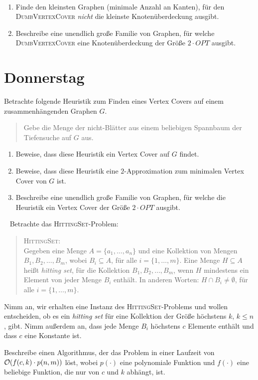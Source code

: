 \documentclass{uebung_cs}
\begin{document}
\begin{aufgabe}[DumbVertexCover]\
	\begin{enumerate}
		\item Finde den kleinsten Graphen (minimale Anzahl an Kanten), für den \textsc{DumbVertexCover} \emph{nicht} die kleinste Knotenüberdeckung ausgibt.
		\item Beschreibe eine unendlich große Familie von Graphen, für welche \textsc{DumbVertexCover} eine Knotenüberdeckung der Größe $2 \cdot OPT$ ausgibt.
	\end{enumerate}
\end{aufgabe}

\section*{Donnerstag}


\begin{aufgabe}[Approximationsalgorithmen]
	Betrachte folgende Heuristik zum Finden eines Vertex Covers auf einem zusammenhängenden Graphen $G$.
	\begin{quote}
		Gebe die Menge der nicht-Blätter aus einem beliebigen Spannbaum der Tiefensuche auf $G$ aus.
	\end{quote}
	\begin{enumerate}
		\item Beweise, dass diese Heuristik ein Vertex Cover auf $G$ findet.
		\item Beweise, dass diese Heuristik eine $2$-Approximation zum minimalen Vertex Cover von $G$ ist.
		\item Beschreibe eine unendlich große Familie von Graphen, für welche die Heuristik ein Vertex Cover der Größe $2 \cdot OPT$ ausgibt.
	\end{enumerate}
\end{aufgabe}

\begin{aufgabe}\
	Betrachte das \textsc{HittingSet}-Problem:
	\begin{quote}
		\textsc{HittingSet}:\\
		Gegeben eine Menge $A = \{a_1,\dots,a_n\}$ und eine Kollektion von Mengen $B_1,B_2,\dots,B_m$, wobei $B_i \subseteq A$, für alle $i = \{1,\dots,m\}$. Eine Menge $H \subseteq A$ heißt \emph{hitting set}, für die Kollektion $B_1,B_2,\dots,B_m$, wenn $H$ mindestens ein Element von jeder Menge $B_i$ enthält. In anderen Worten: $H \cap B_i \neq \emptyset$, für alle $i = \{1,\dots,m\}$.
	\end{quote}
	Nimm an, wir erhalten eine Instanz des \textsc{HittingSet}-Problems und wollen entscheiden, ob es ein \emph{hitting set} für eine Kollektion der Größe höchstens $k$, $k \leq n$, gibt. Nimm außerdem an, dass jede Menge $B_i$ höchstens $c$ Elemente enthält und dass $c$ eine Konstante ist.
	
	Beschreibe einen Algorithmus, der das Problem in einer Laufzeit von $\mathcal{O}(f(c,k) \cdot p(n,m))$ löst, wobei $p(\cdot)$ eine polynomiale Funktion und $f(\cdot)$ eine beliebige Funktion, die nur von $c$ und $k$ abhängt, ist.
\end{aufgabe}
\end{document}
